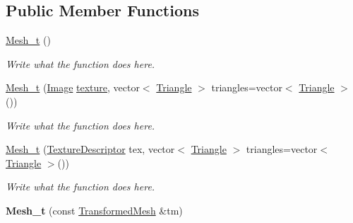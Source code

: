 \subsection*{Public Member Functions}
\begin{DoxyCompactItemize}
\item 
\hyperlink{classMesh__t_a7470247d55566c468487ad876c2ffdea}{Mesh\+\_\+t} ()
\begin{DoxyCompactList}\small\item\em Write what the function does here. \end{DoxyCompactList}\item 
\hyperlink{classMesh__t_aac095dc2addf080dade124661d92291a}{Mesh\+\_\+t} (\hyperlink{classImage}{Image} \hyperlink{classMesh__t_ab6e561d676c5e24beae4d91525f085f9}{texture}, vector$<$ \hyperlink{structTriangle}{Triangle} $>$ triangles=vector$<$ \hyperlink{structTriangle}{Triangle} $>$())
\begin{DoxyCompactList}\small\item\em Write what the function does here. \end{DoxyCompactList}\item 
\hyperlink{classMesh__t_ac109e7906c97e4e95141dc30ef6eed27}{Mesh\+\_\+t} (\hyperlink{structTextureDescriptor}{Texture\+Descriptor} tex, vector$<$ \hyperlink{structTriangle}{Triangle} $>$ triangles=vector$<$ \hyperlink{structTriangle}{Triangle} $>$())
\begin{DoxyCompactList}\small\item\em Write what the function does here. \end{DoxyCompactList}\item 
\hypertarget{classMesh__t_a60d0e2ddfc81f2ec09fdf1b82661ec3c}{{\bfseries Mesh\+\_\+t} (const \hyperlink{structTransformedMesh}{Transformed\+Mesh} \&tm)}\label{classMesh__t_a60d0e2ddfc81f2ec09fdf1b82661ec3c}


\end{DoxyCompactItemize}
